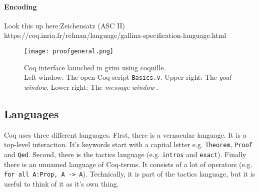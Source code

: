\paragraph{Encoding }
Look this up here:Zeichensatz (ASC II)\\
https://coq.inria.fr/refman/language/gallina-specification-language.html

\begin{figure}[h]
\texttt{[image: proofgeneral.png]}
\caption{Coq interface launched in gvim using coquille.\\ 
Left window: The open Coq-script \texttt{Basics.v}.
Upper right: The {\itshape goal window}. 
Lower right: The {\itshape message window} \cite{COQIDE}.}
\label{fig:Coquille}
\end{figure}

\subsection{Languages}
Coq uses three different languages. 
First, there is a vernacular language. 
It is a top-level interaction. 
It's keywords start with a capital letter e.g. \lstinline!Theorem!, \lstinline!Proof! and  \lstinline!Qed!. 
Second, there is the tactics language (e.g. \lstinline!intros! and \lstinline!exact!).
Finally there is an unnamed language of Coq-terms. 
It consists of a lot of operators (e.g. \lstinline!for all A:Prop, A -> A!).
Technically, it is part of the tactics language, but it is useful to think of it as it's own thing.